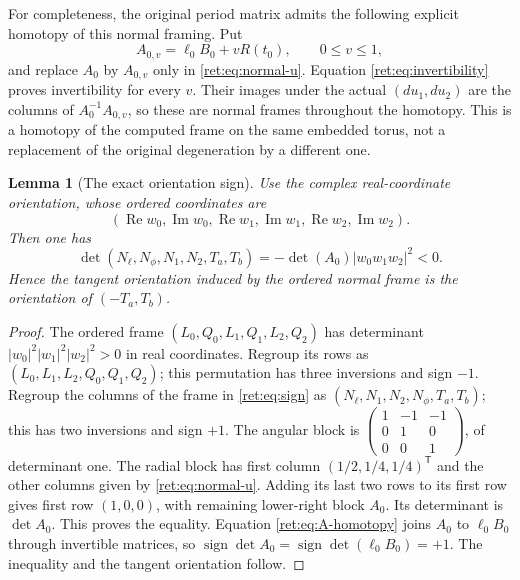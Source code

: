 \documentclass[11pt]{article}
\newtheorem{lemma}[theorem]{Lemma}
\theoremstyle{definition}
\begin{document}
For completeness, the original period matrix admits the following
explicit homotopy of this normal framing.  Put
\begin{equation}
 A_{0,v}=\ell_0B_0+vR(t_0),\qquad 0\leq v\leq1,
 \label{ret:eq:A-homotopy}
\end{equation}
and replace \(A_0\) by \(A_{0,v}\) only in
\eqref{ret:eq:normal-u}.  Equation \eqref{ret:eq:invertibility} proves
invertibility for every \(v\).  Their images under the actual
\((du_1,du_2)\) are the columns of \(A_0^{-1}A_{0,v}\), so these
are normal frames throughout the homotopy.  This is a homotopy of
the computed frame on the same embedded torus, not a replacement of
the original degeneration by a different one.

\begin{lemma}[The exact orientation sign]
Use the complex real-coordinate orientation, whose ordered coordinates are
\[
 (\operatorname{Re}w_0,\operatorname{Im}w_0,
  \operatorname{Re}w_1,\operatorname{Im}w_1,
  \operatorname{Re}w_2,\operatorname{Im}w_2).
\]
Then one has
\begin{equation}
 \det(N_\ell,N_\phi,N_1,N_2,T_a,T_b)
       =-\det(A_0)|w_0w_1w_2|^2<0.
 \label{ret:eq:sign}
\end{equation}
Hence the tangent orientation induced by the ordered normal frame is
the orientation of \((-T_a,T_b)\).
\end{lemma}
\begin{proof}
The ordered frame \((L_0,Q_0,L_1,Q_1,L_2,Q_2)\) has determinant
\(|w_0|^2|w_1|^2|w_2|^2>0\) in real coordinates.  Regroup its rows
as \((L_0,L_1,L_2,Q_0,Q_1,Q_2)\); this permutation has three
inversions and sign \(-1\).  Regroup the columns of the frame in
\eqref{ret:eq:sign} as
\((N_\ell,N_1,N_2,N_\phi,T_a,T_b)\); this has two inversions and
sign \(+1\).  The angular block is
\(\left(\begin{smallmatrix}1&-1&-1\\0&1&0\\0&0&1\end{smallmatrix}\right)\),
of determinant one.  The radial block has first column
\((1/2,1/4,1/4)^{\mathsf T}\) and the other columns given by
\eqref{ret:eq:normal-u}.  Adding its last two rows to its first row gives
first row \((1,0,0)\), with remaining lower-right block \(A_0\).
Its determinant is \(\det A_0\).  This proves the equality.
Equation \eqref{ret:eq:A-homotopy} joins \(A_0\) to \(\ell_0B_0\)
through invertible matrices, so
\(\operatorname{sign}\det A_0=\operatorname{sign}\det(\ell_0B_0)=+1\).
The inequality and the tangent orientation follow.
\end{proof}
\end{document}
